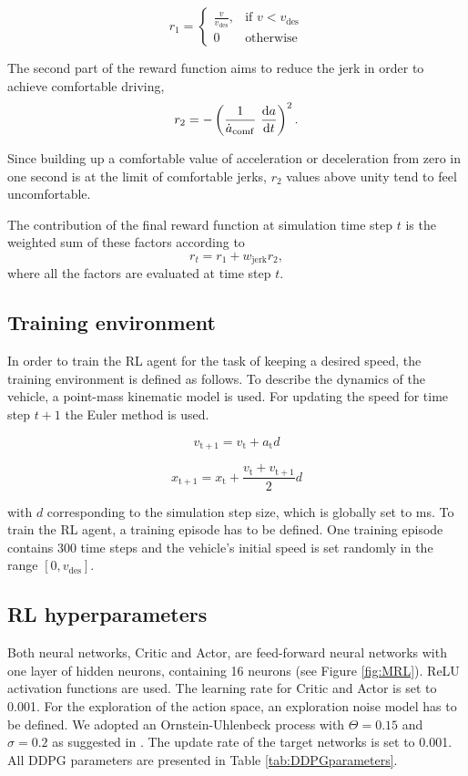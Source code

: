 \documentclass[review]{elsarticle}
\providecommand{\sub}[1]{_{\mathrm{#1}}}  %
\providecommand{\3}{{\ss}}
\begin{document}
\begin{equation}
	r_1  = 
	\begin{cases}
	\frac{v}{v\sub{des}},
	& \text{if } v < v\sub{des}\\
	0
	 & \text{otherwise}
	\end{cases}
\end{equation}

The second part of the reward function aims to reduce the jerk in
order to achieve comfortable driving, 
\begin{equation}
r_2 = -\left(\frac{1}{\dot{a}\sub{comf}} \ \dv{a}{t}\right)^2.
\end{equation}

Since building up a comfortable value of acceleration or deceleration
from zero in one second is at the limit of comfortable jerks, $r_2$
values above unity tend to feel uncomfortable.


The contribution of the final reward function at simulation time step $t$ is the weighted
sum of these factors according to
\begin{equation}
\label{rt1}
r_t =r_1 + w\sub{jerk} r_2,
\end{equation}
where all the factors are evaluated at time step $t$. 


\subsection{Training environment}
\label{training_environment1}
In order to train the RL agent for the task of keeping a desired speed, the training environment is defined as follows. To describe the dynamics of the vehicle, a point-mass kinematic model is used. For updating the speed for time step $t + 1$ the Euler method is used.

\begin{equation}
	v\sub{t+1} = v\sub{t} + a\sub{t} d
\end{equation}

\begin{equation}
x\sub{t+1} = x\sub{t} + \frac{v\sub{t} + v\sub{t+1}}{2} d
\end{equation}


with $d$ corresponding to the simulation step size, which is globally
set to \unit[100]{ms}. To train the RL agent, a training episode has to be defined. One training episode contains 300 time steps and the vehicle's initial speed is set randomly in the range $[0,v\sub{des}]$.

\subsection{RL hyperparameters}
Both neural networks, Critic and Actor, are feed-forward neural networks with one layer of hidden neurons, containing 16 neurons (see Figure \ref{fig:MRL}). ReLU activation functions are used.  The learning rate for Critic and Actor is set to 0.001. For the exploration of the action space, an exploration noise model has to be defined. We adopted an Ornstein-Uhlenbeck process with $\Theta = 0.15$  and $\sigma = 0.2$ as suggested in \cite{DDPG}. The update rate of the target networks is set to 0.001.
All DDPG parameters are presented in Table \ref{tab:DDPGparameters}.
\end{document}

